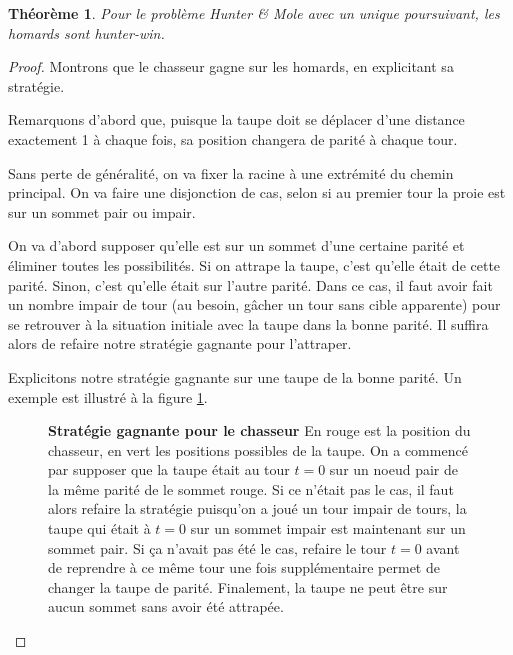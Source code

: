 \documentclass[12pt]{article}
\newtheorem{theoreme}{Théorème}
\newcommand{\hm}{Hunter \& Mole\xspace}
\begin{document}
\begin{theoreme}\label{thm:lobster}
    Pour le problème \hm avec un unique poursuivant, les homards sont hunter-win.
\end{theoreme}

\begin{proof}
Montrons que le chasseur gagne sur les homards, en explicitant sa stratégie.

Remarquons d'abord que, puisque la taupe doit se déplacer d'une distance exactement 1 à chaque fois, sa position changera de parité à chaque tour.

Sans perte de généralité, on va fixer la racine à une extrémité du chemin principal. On va faire une disjonction de cas, selon si au premier tour la proie est sur un sommet pair ou impair. 

On va d'abord supposer qu'elle est sur un sommet d'une certaine parité et éliminer toutes les possibilités. Si on attrape la taupe, c'est qu'elle était de cette parité. Sinon, c'est qu'elle était sur l'autre parité. Dans ce cas, il faut avoir fait un nombre impair de tour (au besoin, gâcher un tour sans cible apparente) pour se retrouver à la situation initiale avec la taupe dans la bonne parité. Il suffira alors de refaire notre stratégie gagnante pour l'attraper. 

Explicitons notre stratégie gagnante sur une taupe de la bonne parité. Un exemple est illustré à la figure \ref{fig:hunter-win}.

\begin{figure}[]
    \centering
    \quad\quad
    \quad\quad
    \quad\quad
    \quad\quad
    \quad\quad
    \quad\quad
    
    \caption{\textbf{Stratégie gagnante pour le chasseur} En rouge est la position du chasseur, en vert les positions possibles de la taupe. On a commencé par supposer que la taupe était au tour $t=0$ sur un noeud pair de la même parité de le sommet rouge. Si ce n'était pas le cas, il faut alors refaire la stratégie puisqu'on a joué un tour impair de tours, la taupe qui était à $t=0$ sur un sommet impair est maintenant sur un sommet pair. Si ça n'avait pas été le cas, refaire le tour $t=0$ avant de reprendre à ce même tour une fois supplémentaire permet de changer la taupe de parité. Finalement, la taupe ne peut être sur aucun sommet sans avoir été attrapée.}
    \label{fig:hunter-win}
\end{figure}


\end{proof}
\end{document}
